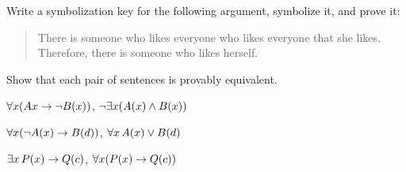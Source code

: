 \solutions
\problempart
\label{pr.likes}
Write a symbolization key for the following argument, symbolize it, and prove it:
\begin{quote}
There is someone who likes everyone who likes everyone that she likes. Therefore, there is someone who likes herself.
\end{quote}

\problempart
Show that each pair of sentences is provably equivalent.
\begin{compactlist}
\item $\forall x (Ax\rightarrow \neg \mathord{B}(x))$, $\neg\exists x(\mathord{A}(x) \wedge \mathord{B}(x))$
\item $\forall x (\neg \mathord{A}(x)\rightarrow \mathord{B}(d))$, $\forall x\,\mathord{A}(x) \vee \mathord{B}(d)$
\item $\exists x\,\mathord{P}(x) \rightarrow \mathord{Q}(c)$, $\forall x (\mathord{P}(x) \rightarrow \mathord{Q}(c))$
\end{compactlist}



